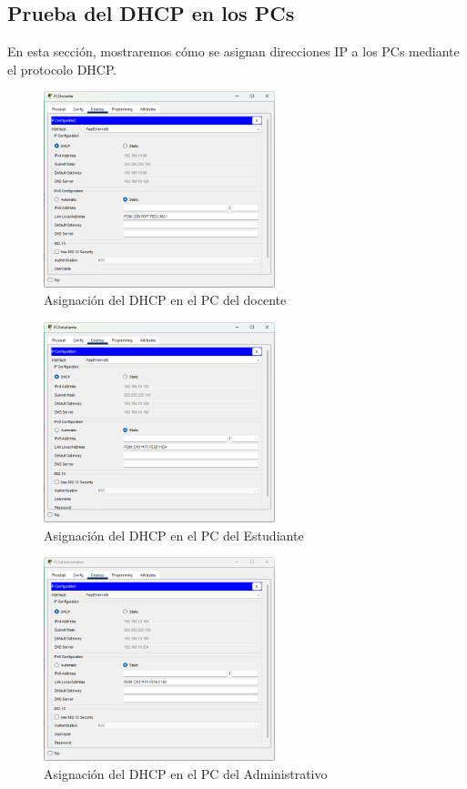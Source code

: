     \subsection*{Prueba del DHCP en los PCs}
    En esta sección, mostraremos cómo se asignan direcciones IP a los PCs mediante el protocolo DHCP.
    \begin{figure}[H]
        \centering
        \includegraphics[width=0.6\textwidth]{img/dhcpdoc.png}
        \caption{Asignación del DHCP en el PC del docente}
        \label{fig:pcdDhcp}
    \end{figure}
    \begin{figure}[H]
        \centering
        \includegraphics[width=0.6\textwidth]{img/dchpestu.png}
        \caption{Asignación del DHCP en el PC del Estudiante}
        \label{fig:pceDhcp}
    \end{figure}
    \begin{figure}[H]
        \centering
        \includegraphics[width=0.6\textwidth]{img/dhcpAdminis.png}
        \caption{Asignación del DHCP en el PC del Administrativo}
        \label{fig:pcADhcp}
    \end{figure}
   
